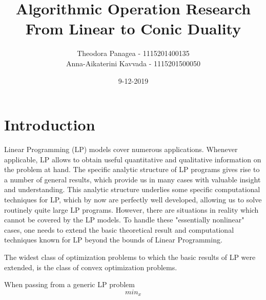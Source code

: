 \documentclass[12pt]{article}
\title{Algorithmic Operation Research \\ From Linear to Conic Duality}
\date{9-12-2019}
\author{Theodora Panagea - 1115201400135 \\ Anna-Aikaterini Kavvada - 1115201500050}
\begin{document}
	\maketitle{}
  	\tableofcontents
  	\section{Introduction}
  	
  	Linear Programming (LP) models cover numerous applications. Whenever applicable, LP allows to obtain useful quantitative and qualitative information on the problem at hand. The specific analytic structure of LP programs gives rise to a number of general results, which provide us in many cases with valuable insight and understanding. This analytic structure underlies some specific computational techniques for LP, which by now are perfectly well developed, allowing us to solve routinely quite large LP programs. However, there are situations in reality which cannot be covered by the LP models. To handle these "essentially nonlinear" cases, one needs to extend the basic theoretical result and computational techniques known for LP beyond the bounds of Linear Programming.\par
  	The widest class of optimization problems to which the basic results of LP were extended, is the class of convex optimization problems. \par
  	When passing from a generic LP problem 
  	$$min_x$$
\end{document}
